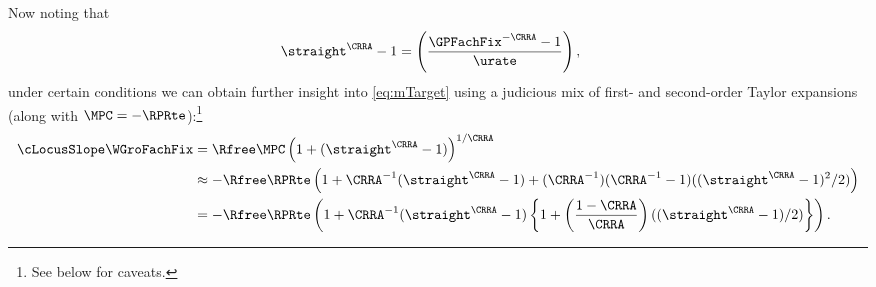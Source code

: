\documentclass{econark}
\begin{document}
Now noting that
\begin{equation}\begin{gathered}\begin{aligned}
  \straight^{\CRRA}-1 & =  \left(\frac{\GPFachFix^{-\CRRA} - 1}{\urate}\right),
\end{aligned}\end{gathered}\end{equation}
under certain conditions we can obtain further insight into \eqref{eq:mTarget} using a judicious mix of first- and second-order Taylor expansions (along with $\MPC = -\RPRte$):\footnote{See below for caveats.}
\begin{equation}\begin{gathered}\begin{aligned}
  \label{eq:zetaExp}
  \cLocusSlope\WGroFachFix & =  \Rfree \MPC \left(1+(\straight^{\CRRA}-1)\right)^{1/\CRRA}
\\ & \approx  -\Rfree \RPRte \left(1+\CRRA^{-1}(\straight^{\CRRA}-1)+(\CRRA^{-1})(\CRRA^{-1}-1)((\straight^{\CRRA}-1)^{2}/2)\right)
\\ & =  -\Rfree \RPRte \left(1+\CRRA^{-1}(\straight^{\CRRA}-1)\left\{1+\left(\frac{1-\CRRA}{\CRRA}\right)((\straight^{\CRRA}-1)/2)\right\}\right) %
.
\end{aligned}\end{gathered}\end{equation}
\end{document}

